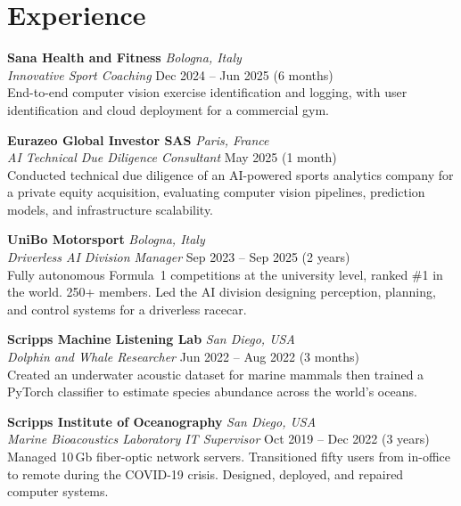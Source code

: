\documentclass[11pt,a4paper]{article}
\begin{document}
\section{Experience}

\textbf{Sana Health and Fitness} \hfill \textit{Bologna, Italy}\\
\textit{Innovative Sport Coaching} \hfill Dec 2024 -- Jun 2025 (6 months)\\
End-to-end computer vision exercise identification and logging, with user identification and cloud deployment for a commercial gym.

\vspace{0.4em}
\textbf{Eurazeo Global Investor SAS} \hfill \textit{Paris, France}\\
\textit{AI Technical Due Diligence Consultant} \hfill May 2025 (1 month)\\
Conducted technical due diligence of an AI-powered sports analytics company for a private equity acquisition, evaluating computer vision pipelines, prediction models, and infrastructure scalability.

\vspace{0.4em}
\textbf{UniBo Motorsport} \hfill \textit{Bologna, Italy}\\
\textit{Driverless AI Division Manager} \hfill Sep 2023 -- Sep 2025 (2 years)\\
Fully autonomous Formula~1 competitions at the university level, ranked \#1 in the world. 250+ members. Led the AI division designing perception, planning, and control systems for a driverless racecar.

\vspace{0.4em}
\textbf{Scripps Machine Listening Lab} \hfill \textit{San Diego, USA}\\
\textit{Dolphin and Whale Researcher} \hfill Jun 2022 -- Aug 2022 (3 months)\\
Created an underwater acoustic dataset for marine mammals then trained a PyTorch classifier to estimate species abundance across the world's oceans.

\vspace{0.4em}
\textbf{Scripps Institute of Oceanography} \hfill \textit{San Diego, USA}\\
\textit{Marine Bioacoustics Laboratory IT Supervisor} \hfill Oct 2019 -- Dec 2022 (3 years)\\
Managed 10\,Gb fiber-optic network servers. Transitioned fifty users from in-office to remote during the COVID-19 crisis. Designed, deployed, and repaired computer systems.
\end{document}
